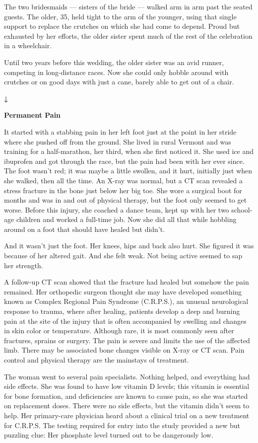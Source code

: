 The two bridesmaids --- sisters of the bride --- walked arm in arm past
the seated guests. The older, 35, held tight to the arm of the younger,
using that single support to replace the crutches on which she had come
to depend. Proud but exhausted by her efforts, the older sister spent
much of the rest of the celebration in a wheelchair.

Until two years before this wedding, the older sister was an avid
runner, competing in long-distance races. Now she could only hobble
around with crutches or on good days with just a cane, barely able to
get out of a chair.

\textbf{↓}

\textbf{Permanent Pain}

It started with a stabbing pain in her left foot just at the point in
her stride where she pushed off from the ground. She lived in rural
Vermont and was training for a half-marathon, her third, when she first
noticed it. She used ice and ibuprofen and got through the race, but the
pain had been with her ever since. The foot wasn't red; it was maybe a
little swollen, and it hurt, initially just when she walked, then all
the time. An X-ray was normal, but a CT scan revealed a stress fracture
in the bone just below her big toe. She wore a surgical boot for months
and was in and out of physical therapy, but the foot only seemed to get
worse. Before this injury, she coached a dance team, kept up with her
two school-age children and worked a full-time job. Now she did all that
while hobbling around on a foot that should have healed but didn't.

And it wasn't just the foot. Her knees, hips and back also hurt. She
figured it was because of her altered gait. And she felt weak. Not being
active seemed to sap her strength.

A follow-up CT scan showed that the fracture had healed but somehow the
pain remained. Her orthopedic surgeon thought she may have developed
something known as Complex Regional Pain Syndrome (C.R.P.S.), an unusual
neurological response to trauma, where after healing, patients develop a
deep and burning pain at the site of the injury that is often
accompanied by swelling and changes in skin color or temperature.
Although rare, it is most commonly seen after fractures, sprains or
surgery. The pain is severe and limits the use of the affected limb.
There may be associated bone changes visible on X-ray or CT scan. Pain
control and physical therapy are the mainstays of treatment.

The woman went to several pain specialists. Nothing helped, and
everything had side effects. She was found to have low vitamin D levels;
this vitamin is essential for bone formation, and deficiencies are known
to cause pain, so she was started on replacement doses. There were no
side effects, but the vitamin didn't seem to help. Her primary-care
physician heard about a clinical trial on a new treatment for C.R.P.S.
The testing required for entry into the study provided a new but
puzzling clue: Her phosphate level turned out to be dangerously low.

